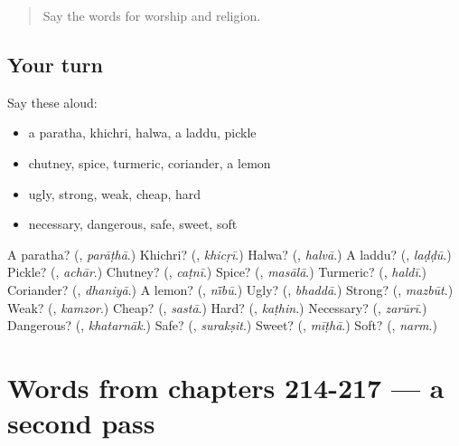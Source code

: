 \label{lesson:HI-R217-first-pass-words-from-chapters-210-213}



\begin{quote}
Say the words for worship and religion.
\end{quote}

\subsection*{Your turn}
Say these aloud:

\begin{itemize}
\raggedright
  \item a paratha, khichri, halwa, a laddu, pickle
  \item chutney, spice, turmeric, coriander, a lemon
  \item ugly, strong, weak, cheap, hard
  \item necessary, dangerous, safe, sweet, soft
\end{itemize}

\begin{tcolorbox}[breakable,colback=teal!4,colframe=teal!35!black,title={Before you move on}]
A paratha? (\textbf{}, \emph{parāṭhā}.) Khichri? (\textbf{}, \emph{khicṛī}.) Halwa? (\textbf{}, \emph{halvā}.) A laddu? (\textbf{}, \emph{laḍḍū}.) Pickle? (\textbf{}, \emph{achār}.) Chutney? (\textbf{}, \emph{caṭnī}.) Spice? (\textbf{}, \emph{masālā}.) Turmeric? (\textbf{}, \emph{haldī}.) Coriander? (\textbf{}, \emph{dhaniyā}.) A lemon? (\textbf{}, \emph{nī̃bū}.) Ugly? (\textbf{}, \emph{bhaddā}.) Strong? (\textbf{}, \emph{mazbūt}.) Weak? (\textbf{}, \emph{kamzor}.) Cheap? (\textbf{}, \emph{sastā}.) Hard? (\textbf{}, \emph{kaṭhin}.) Necessary? (\textbf{}, \emph{zarūrī}.) Dangerous? (\textbf{}, \emph{khatarnāk}.) Safe? (\textbf{}, \emph{surakṣit}.) Sweet? (\textbf{}, \emph{mīṭhā}.) Soft? (\textbf{}, \emph{narm}.)
\end{tcolorbox}
\section[(dialogue)]{Words from chapters 214-217 — a second pass}

\label{lesson:HI-R217-second-pass-words-from-chapters-214-217}



